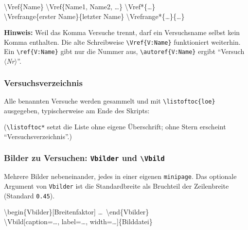 \documentclass[a4paper,11pt,parskip=half]{scrartcl}
\newcommand{\cs}[1]{\texttt{\textbackslash #1}}
\newcommand{\env}[1]{\texttt{#1}}
\newcommand{\meta}[1]{\ensuremath{\langle}\textit{#1}\ensuremath{\rangle}}
\newcommand{\hinweis}[1]{%
  \begin{tcolorbox}[colback=orange!6, colframe=orange!60!black, boxrule=0.4pt, arc=1mm,
    left=2mm, right=2mm, top=1mm, bottom=1mm]
    \small\textbf{Hinweis:} #1
  \end{tcolorbox}}
\begin{document}
\begin{befehl}{\textbackslash Vref\{Name\} \quad \textbackslash Vref\{Name1, Name2, \dots\} \quad \textbackslash Vref*\{\dots\}\\
\textbackslash Vrefrange\{erster Name\}\{letzter Name\} \quad \textbackslash Vrefrange*\{\dots\}\{\dots\}}\end{befehl}

\begin{beispielseite}





\end{beispielseite}

\hinweis{Weil das Komma Versuche trennt, darf ein Versuchsname selbst kein Komma enthalten.
Die alte Schreibweise \cs{Vref}\texttt{\{V:Name\}} funktioniert weiterhin.
Ein \cs{ref}\texttt{\{V:Name\}} gibt nur die Nummer aus, \cs{autoref}\texttt{\{V:Name\}} ergibt
\enquote{Versuch \meta{Nr}}.}

\subsubsection*{Versuchsverzeichnis}

Alle benannten Versuche werden gesammelt und mit \cs{listoftoc}\texttt{\{loe\}} ausgegeben,
typischerweise am Ende des Skripts:

\begin{beispiel}
\end{beispiel}
(\cs{listoftoc*} setzt die Liste ohne eigene Überschrift; ohne Stern erscheint \enquote{Versuchsverzeichnis}.)

\subsubsection*{Bilder zu Versuchen: \env{Vbilder} und \cs{Vbild}}

Mehrere Bilder nebeneinander, jedes in einer eigenen \texttt{minipage}. Das optionale Argument
von \env{Vbilder} ist die Standardbreite als Bruchteil der Zeilenbreite (Standard \texttt{0.45}).

\begin{befehl}{\textbackslash begin\{Vbilder\}[Breitenfaktor] \dots\ \textbackslash end\{Vbilder\}\\
\textbackslash Vbild[caption=\dots, label=\dots, width=\dots]\{Bilddatei\}}\end{befehl}
\end{document}

